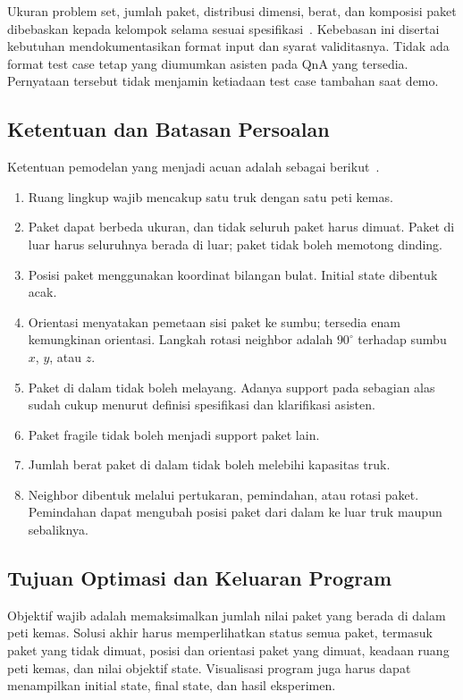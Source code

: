 \documentclass[11pt,a4paper]{article}
\begin{document}
Ukuran problem set, jumlah paket, distribusi dimensi, berat, dan komposisi paket
dibebaskan kepada kelompok selama sesuai spesifikasi~\cite{qna}. Kebebasan ini
disertai kebutuhan mendokumentasikan format input dan syarat validitasnya.
Tidak ada format test case tetap yang diumumkan asisten pada QnA yang tersedia.
Pernyataan tersebut tidak menjamin ketiadaan test case tambahan saat demo.

\subsection{Ketentuan dan Batasan Persoalan}
Ketentuan pemodelan yang menjadi acuan adalah sebagai berikut~\cite{spesifikasi,qna}.
\begin{enumerate}
\item Ruang lingkup wajib mencakup satu truk dengan satu peti kemas.
\item Paket dapat berbeda ukuran, dan tidak seluruh paket harus dimuat.
      Paket di luar harus seluruhnya berada di luar; paket tidak boleh memotong dinding.
\item Posisi paket menggunakan koordinat bilangan bulat. Initial state dibentuk acak.
\item Orientasi menyatakan pemetaan sisi paket ke sumbu; tersedia enam kemungkinan
      orientasi. Langkah rotasi neighbor adalah $90^\circ$ terhadap sumbu $x$, $y$, atau $z$.
\item Paket di dalam tidak boleh melayang. Adanya support pada sebagian alas
      sudah cukup menurut definisi spesifikasi dan klarifikasi asisten.
\item Paket fragile tidak boleh menjadi support paket lain.
\item Jumlah berat paket di dalam tidak boleh melebihi kapasitas truk.
\item Neighbor dibentuk melalui pertukaran, pemindahan, atau rotasi paket.
      Pemindahan dapat mengubah posisi paket dari dalam ke luar truk maupun sebaliknya.
\end{enumerate}

\subsection{Tujuan Optimasi dan Keluaran Program}
Objektif wajib adalah memaksimalkan jumlah nilai paket yang berada di dalam
peti kemas. Solusi akhir harus memperlihatkan status semua paket, termasuk
paket yang tidak dimuat, posisi dan orientasi paket yang dimuat, keadaan ruang
peti kemas, dan nilai objektif state. Visualisasi program juga harus dapat
menampilkan initial state, final state, dan hasil eksperimen.
\end{document}
